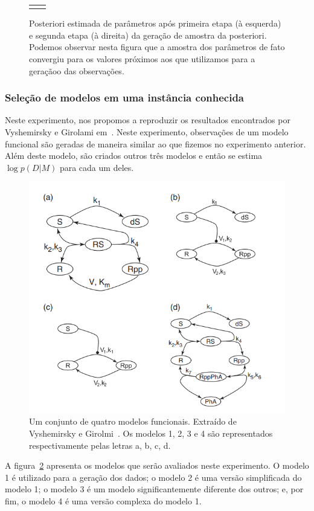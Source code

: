 \documentclass[12pt]{article}
\begin{document}
\begin{figure}[!ht]
\begin{tabular}{c c}
{    \label{fig:posterior_kcat_2} }
    \\
  \end{tabular}
    \caption{Posteriori estimada de parâmetros após primeira etapa (à 
    esquerda) e segunda etapa (à direita) da geração de amostra da 
    posteriori. Podemos observar nesta figura que a amostra dos 
    parâmetros de fato convergiu para os valores próximos aos que 
    utilizamos para a geraçãoo das observações.}
  \label{fig:posteriori_parameters} 
\end{figure}

\subsubsection{Seleção de modelos em uma instância conhecida}
Neste experimento, nos propomos a reproduzir os resultados encontrados 
por Vyshemirsky e Girolami em~\cite{Vyshemirsky2008}. Neste 
experimento, observações de um modelo funcional são geradas de maneira
similar ao que fizemos no experimento anterior. Além deste modelo, são
criados outros três modelos e então se estima $\log p (D | M)$ para cada 
um deles.

\begin{figure}[ht]
    \begin{center}
    \includegraphics[width=0.65\linewidth]{Vyshemirsky_models.png}
    \caption{Um conjunto de quatro modelos funcionais. Extraído de
        Vyshemirsky e Girolmi~\cite{Vyshemirsky}. Os modelos 1, 2, 3 e
        4 são representados respectivamente pelas letras a, b, c, d.}
    \label{fig:vyshemirsky_models}
    \end{center}

\end{figure}

A figura~\ref{fig:vyshemirsky_models} apresenta os modelos que serão
avaliados neste experimento. O modelo 1 é utilizado para a geração dos
dados; o modelo 2 é uma versão simplificada do modelo 1; o modelo 3 é
um modelo significantemente diferente dos outros; e, por fim, o modelo 4
é uma versão complexa do modelo 1. 
\end{document}
